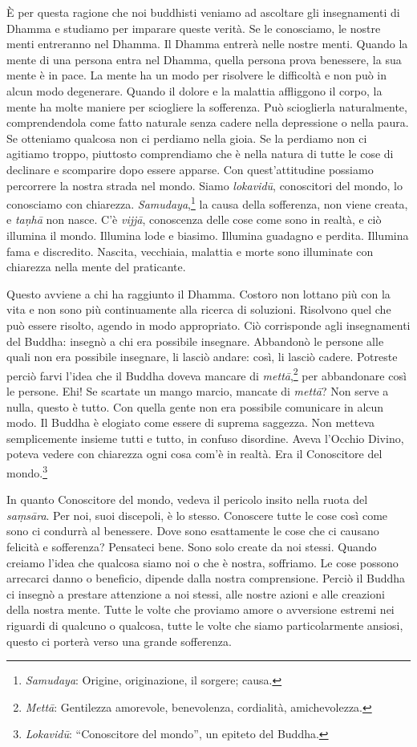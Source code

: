 È per questa ragione che noi buddhisti veniamo ad ascoltare gli
insegnamenti di Dhamma e studiamo per imparare queste verità. Se le
conosciamo, le nostre menti entreranno nel Dhamma. Il Dhamma entrerà
nelle nostre menti. Quando la mente di una persona entra nel Dhamma,
quella persona prova benessere, la sua mente è in pace. La mente ha un
modo per risolvere le difficoltà e non può in alcun modo degenerare.
Quando il dolore e la malattia affliggono il corpo, la mente ha molte
maniere per sciogliere la sofferenza. Può scioglierla naturalmente,
comprendendola come fatto naturale senza cadere nella depressione o
nella paura. Se otteniamo qualcosa non ci perdiamo nella gioia. Se la
perdiamo non ci agitiamo troppo, piuttosto comprendiamo che è nella
natura di tutte le cose di declinare e scomparire dopo essere apparse.
Con quest'attitudine possiamo percorrere la nostra strada nel mondo.
Siamo \emph{lokavidū}, conoscitori del mondo, lo conosciamo con
chiarezza. \emph{Samudaya},\footnote{%
  \emph{Samudaya}: Origine, originazione, il sorgere; causa.}
la causa della sofferenza, non viene
creata, e \emph{taṇhā} non nasce. C'è \emph{vijjā}, conoscenza delle
cose come sono in realtà, e ciò illumina il mondo. Illumina lode e
biasimo. Illumina guadagno e perdita. Illumina fama e discredito.
Nascita, vecchiaia, malattia e morte sono illuminate con chiarezza nella
mente del praticante.

Questo avviene a chi ha raggiunto il Dhamma. Costoro non lottano più con
la vita e non sono più continuamente alla ricerca di soluzioni.
Risolvono quel che può essere risolto, agendo in modo appropriato. Ciò
corrisponde agli insegnamenti del Buddha: insegnò a chi era possibile
insegnare. Abbandonò le persone alle quali non era possibile insegnare,
li lasciò andare: così, li lasciò cadere. Potreste perciò farvi l'idea
che il Buddha doveva mancare di \emph{mettā},\footnote{\emph{Mettā}:
  Gentilezza amorevole, benevolenza, cordialità, amichevolezza.} per
abbandonare così le persone. Ehi! Se scartate un mango marcio, mancate
di \emph{mettā}? Non serve a nulla, questo è tutto. Con quella gente non
era possibile comunicare in alcun modo. Il Buddha è elogiato come essere
di suprema saggezza. Non metteva semplicemente insieme tutti e tutto, in
confuso disordine. Aveva l'Occhio Divino, poteva vedere con chiarezza
ogni cosa com'è in realtà. Era il Conoscitore del mondo.\footnote{\emph{Lokavidū}:
  ``Conoscitore del mondo'', un epiteto del Buddha.}

In quanto Conoscitore del mondo, vedeva il pericolo insito nella ruota
del \emph{saṃsāra}. Per noi, suoi discepoli, è lo stesso. Conoscere
tutte le cose così come sono ci condurrà al benessere. Dove sono
esattamente le cose che ci causano felicità e sofferenza? Pensateci
bene. Sono solo create da noi stessi. Quando creiamo l'idea che qualcosa
siamo noi o che è nostra, soffriamo. Le cose possono arrecarci danno o
beneficio, dipende dalla nostra comprensione. Perciò il Buddha ci
insegnò a prestare attenzione a noi stessi, alle nostre azioni e alle
creazioni della nostra mente. Tutte le volte che proviamo amore o
avversione estremi nei riguardi di qualcuno o qualcosa, tutte le volte
che siamo particolarmente ansiosi, questo ci porterà verso una grande
sofferenza.

